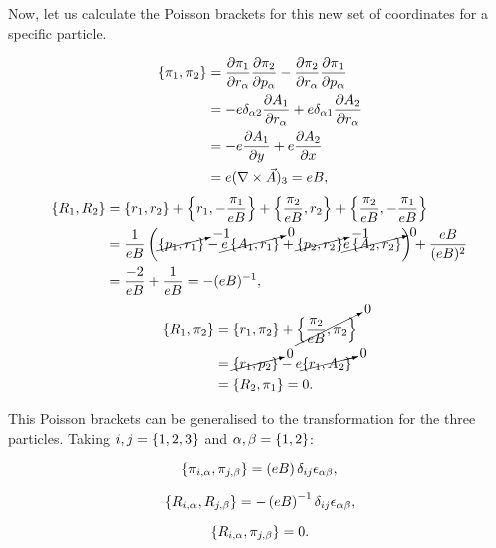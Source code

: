 Now, let us calculate the Poisson brackets for this new set of coordinates for a specific particle.

\begin{align*}
\left\lbrace \pi_1, \pi_2 \right\rbrace &= \frac{\partial \pi_1}{\partial r_{\alpha}}\frac{\partial \pi_2}{\partial p_{\alpha}} - \frac{\partial \pi_2}{\partial r_{\alpha}}\frac{\partial \pi_1}{\partial p_{\alpha}}\\
&= -e\delta_{\alpha 2}\frac{\partial A_1}{\partial r_{\alpha}} +e\delta_{\alpha 1}\frac{\partial A_2}{\partial r_{\alpha}}\\
&= -e\frac{\partial A_1}{\partial y}  + e\frac{\partial A_2}{\partial x}\\
&= e(\nabla \times \vec{A})_3 = eB,
\end{align*}
\begin{align*}
\left\lbrace R_1, R_2 \right\rbrace &= \left\lbrace r_1, r_2 \right\rbrace + \left\lbrace r_1, -\frac{\pi_1}{eB} \right\rbrace +\left\lbrace \frac{\pi_2}{eB}, r_2 \right\rbrace + \left\lbrace \frac{\pi_2}{eB}, -\frac{\pi_1}{eB} \right\rbrace\\
&= \frac{1}{eB}\left( \cancelto{-1}{\left\lbrace p_1, r_1 \right\rbrace}- \cancelto{0}{e\left\lbrace A_1, r_1 \right\rbrace}+\cancelto{-1}{\left\lbrace p_2, r_2 \right\rbrace} \cancelto{0}{e\left\lbrace A_2, r_2 \right\rbrace} \right) +\frac{eB}{(eB)^2}\\
&= \frac{-2}{eB}+ \frac{1}{eB} = -(eB)^{-1},
\end{align*}
\begin{align*}
\left\lbrace R_{1}, \pi_{2} \right\rbrace &= \left\lbrace r_1, \pi_2 \right\rbrace+\cancelto{0}{\left\lbrace \frac{\pi_2}{eB}, \pi_2 \right\rbrace}\\
&= \cancelto{0}{\left\lbrace r_1, p_2 \right\rbrace}-e\cancelto{0}{\left\lbrace r_1, A_2 \right\rbrace}\\
&= \left\lbrace R_2, \pi_1 \right\rbrace = 0.
\end{align*}

This Poisson brackets can be generalised to the transformation for the three particles. Taking $i,j = \left\lbrace 1,2, 3 \right\rbrace$ and $\alpha,\beta=\left\lbrace 1, 2 \right\rbrace$:

\begin{equation}
\left\lbrace \pi_{i,\alpha}, \pi_{j,\beta} \right\rbrace=\left( eB \right)\delta_{ij}\epsilon_{\alpha \beta},
\label{eq:pb1}
\end{equation}

\begin{equation}
\left\lbrace R_{i,\alpha}, R_{j,\beta} \right\rbrace= -\left( eB \right)^{-1} \delta_{ij}\epsilon_{\alpha \beta}  ,
\label{eq:pb2}
\end{equation}

\begin{equation}
\left\lbrace R_{i,\alpha}, \pi_{j,\beta} \right\rbrace=0.
\label{eq:pb3} 
\end{equation}

